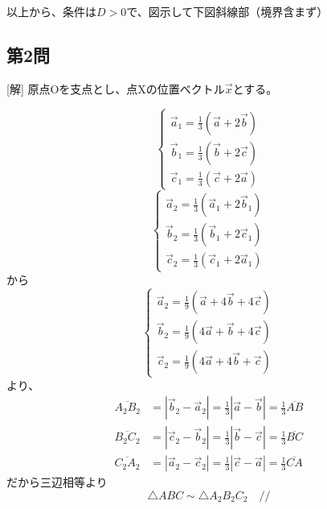 \documentclass[../main.tex]{subfiles}
\begin{document}
以上から、条件は$D>0$で、図示して下図斜線部（境界含まず）

\begin{center}
\end{center}

\subsection*{第2問}
[解] 原点Oを支点とし、点Xの位置ベクトル$\vec{x}$とする。

\[
  \begin{cases}
    \vec{a}_1 = \frac{1}{3}(\vec{a}+2\vec{b}) \\
    \vec{b}_1 = \frac{1}{3}(\vec{b}+2\vec{c}) \\
    \vec{c}_1 = \frac{1}{3}(\vec{c}+2\vec{a})
  \end{cases}
\]
\[
  \begin{cases}
    \vec{a}_2 = \frac{1}{3}(\vec{a}_1+2\vec{b}_1) \\
    \vec{b}_2 = \frac{1}{3}(\vec{b}_1+2\vec{c}_1) \\
    \vec{c}_2 = \frac{1}{3}(\vec{c}_1+2\vec{a}_1)
  \end{cases}
\]
から
\[
  \begin{cases}
    \vec{a}_2 = \frac{1}{9}(\vec{a}+4\vec{b}+4\vec{c}) \\
    \vec{b}_2 = \frac{1}{9}(4\vec{a}+\vec{b}+4\vec{c}) \\
    \vec{c}_2 = \frac{1}{9}(4\vec{a}+4\vec{b}+\vec{c})
  \end{cases}
\]
より、
\begin{align*}
  \overline{A_2B_2} &= |\vec{b}_2-\vec{a}_2| = \frac{1}{3}|\vec{a}-\vec{b}| = \frac{1}{3}\overline{AB} \\
  \overline{B_2C_2} &= |\vec{c}_2-\vec{b}_2| = \frac{1}{3}|\vec{b}-\vec{c}| = \frac{1}{3}\overline{BC} \\
  \overline{C_2A_2} &= |\vec{a}_2-\vec{c}_2| = \frac{1}{3}|\vec{c}-\vec{a}| = \frac{1}{3}\overline{CA}
\end{align*}
だから三辺相等より
\[ \triangle ABC \sim \triangle A_2B_2C_2 \quad // \]
\end{document}
